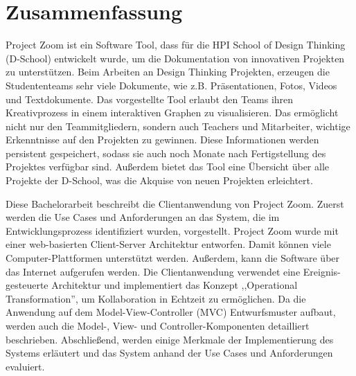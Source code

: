 \chapter*{Zusammenfassung}
\hypertarget{abstract_de}{}

Project Zoom ist ein Software Tool, dass für die HPI School of Design Thinking (D-School) entwickelt wurde, um die Dokumentation von innovativen Projekten zu unterstützen. Beim Arbeiten an Design Thinking Projekten, erzeugen die Studententeams sehr viele Dokumente, wie z.B. Präsentationen, Fotos, Videos und Textdokumente. Das vorgestellte Tool erlaubt den Teams ihren Kreativprozess in einem interaktiven Graphen zu visualisieren. Das ermöglicht nicht nur den Teammitgliedern, sondern auch Teachers und Mitarbeiter, wichtige Erkenntnisse auf den Projekten zu gewinnen. Diese Informationen werden persistent gespeichert, sodass sie auch noch Monate nach Fertigstellung des Projektes verfügbar sind. Außerdem bietet das Tool eine Übersicht über alle Projekte der D-School, was die Akquise von neuen Projekten erleichtert.

Diese Bachelorarbeit beschreibt die Clientanwendung von Project Zoom. Zuerst werden die Use Cases und Anforderungen an das System, die im Entwicklungsprozess identifiziert wurden, vorgestellt. Project Zoom wurde mit einer web-basierten Client-Server Architektur entworfen. Damit können viele Computer-Plattformen unterstützt werden. Außerdem, kann die Software über das Internet aufgerufen werden. Die Clientanwendung verwendet eine Ereignis-gesteuerte Architektur und implementiert das Konzept ,,Operational Transformation'', um Kollaboration in Echtzeit zu ermöglichen. Da die Anwendung auf dem Model-View-Controller (MVC) Entwurfsmuster aufbaut, werden auch die Model-, View- und Controller-Komponenten detailliert beschrieben. Abschließend, werden einige Merkmale der Implementierung des Systems erläutert und das System anhand der Use Cases und Anforderungen evaluiert.